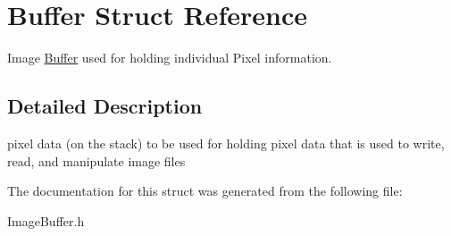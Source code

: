 \hypertarget{structBuffer}{}\section{Buffer Struct Reference}
\label{structBuffer}


Image \hyperlink{structBuffer}{Buffer} used for holding individual Pixel information.  




\subsection{Detailed Description}
pixel data (on the stack) to be used for holding pixel data that is used to write, read, and manipulate image files 

The documentation for this struct was generated from the following file\+:\begin{DoxyCompactItemize}
\item 
Image\+Buffer.\+h\end{DoxyCompactItemize}
